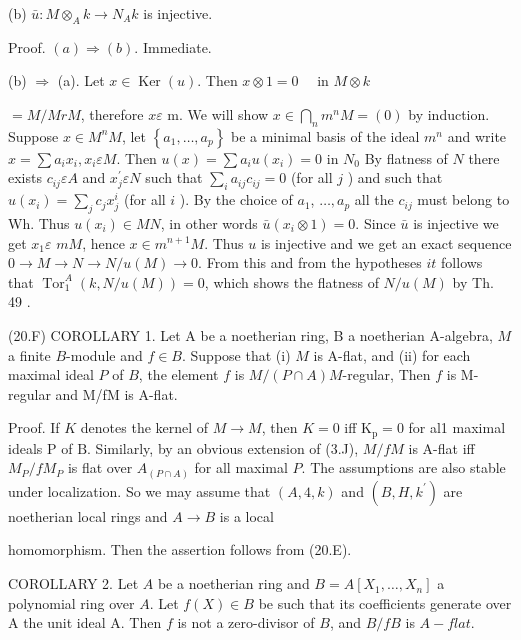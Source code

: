 (b) $\bar{u}: M \otimes_{A} k \rightarrow N_{A} k$ is injective.

Proof. $(a) \Rightarrow(b)$. Immediate.

(b) $\Rightarrow$ (a). Let $x \in \operatorname{Ker}(u)$. Then $x \otimes 1=0 \quad$ in $M \otimes k$

$=M / M r M$, therefore $x \varepsilon$ m. We will show $x \in \bigcap_{n} m^{n} M=(0)$ by induction. Suppose $x \in M^{n} M$, let $\left\{a_{1}, \ldots, a_{p}\right\}$ be a minimal basis of the ideal $m^{n}$ and write $x=\sum a_{i} x_{i}, x_{i} \varepsilon M .$ Then $u(x)=\sum a_{i} u\left(x_{i}\right)=0$ in $N_{0}$ By flatness of $N$ there exists $c_{i j} \varepsilon A$ and $x_{j}^{\prime} \varepsilon N$ such that $\sum_{i} a_{i j} c_{i j}=0$ (for all $j$ ) and such that $u\left(x_{i}\right)=\sum_{j} c_{j} x_{j}^{i}$ (for all $i$ ). By the choice of $a_{1}$, $\ldots, a_{p}$ all the $c_{i j}$ must belong to Wh. Thus $u\left(x_{i}\right) \in M N$, in other words $\bar{u}\left(x_{i} \otimes 1\right)=0$. Since $\bar{u}$ is injective we get $x_{1} \varepsilon$ $m M$, hence $x \in m^{n+1} M$. Thus $u$ is injective and we get an exact sequence $0 \rightarrow M \rightarrow N \rightarrow N / u(M) \rightarrow 0$. From this and from the hypotheses $i t$ follows that $\operatorname{Tor}_{1}^{A}(k, N / u(M))=0$, which shows the flatness of $N / u(M)$ by Th. 49 .

(20.F) COROLLARY 1. Let A be a noetherian ring, B a noetherian A-algebra, $M$ a finite $B$-module and $f \in B$. Suppose that (i) $M$ is A-flat, and (ii) for each maximal ideal $P$ of $B$, the element $f$ is $M /(P \cap A) M$-regular, Then $f$ is M-regular and M/fM is A-flat.

Proof. If $K$ denotes the kernel of $M \rightarrow M$, then $K=0$ iff $\mathrm{K}_{\mathrm{p}}=0$ for al1 maximal ideals $\mathrm{P}$ of $\mathrm{B}$. Similarly, by an obvious extension of (3.J), $M / f M$ is A-flat iff $M_{P} / f M_{P}$ is flat over $A_{(P \cap A)}$ for all maximal $P$. The assumptions are also stable under localization. So we may assume that $(A, 4, k)$ and $\left(B, H, k^{\prime}\right)$ are noetherian local rings and $A \rightarrow B$ is a local

homomorphism. Then the assertion follows from (20.E).

COROLLARY 2. Let $A$ be a noetherian ring and $B=A\left[X_{1}, \ldots, X_{n}\right]$ a polynomial ring over $A$. Let $f(X) \in B$ be such that its coefficients generate over A the unit ideal A. Then $f$ is not a zero-divisor of $B$, and $B / f B$ is $A-f l a t$.

